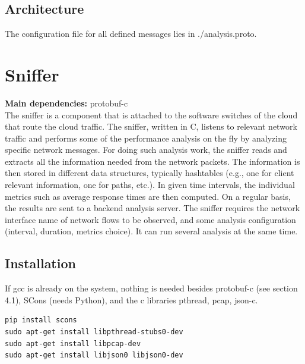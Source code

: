 \documentclass[12pt,hidelinks]{article}
\begin{document}
\subsection{Architecture}
The configuration file for all defined messages lies in ./analysis.proto.

\section{Sniffer}	
\vspace{7.5cm}

\textbf{Main dependencies:} protobuf-c
\\
The sniffer is a component that is attached to the software switches of the cloud that route the cloud traffic. The sniffer, written in C, listens to relevant network traffic and performs some of the performance analysis on the fly by analyzing specific network messages.
For doing such analysis work, the sniffer reads and extracts all the information needed from the network packets. The information is then stored in different data structures, typically hashtables (e.g., one for client relevant information, one for paths, etc.). In given time intervals, the individual metrics such as average response times are then computed. On a regular basis, the results are sent to a backend analysis server.
The sniffer requires the network interface name of network flows to be observed, and some analysis configuration (interval, duration, metrics choice). It can run several analysis at the same time.

\subsection{Installation} 
If gcc is already on the system, nothing is needed besides protobuf-c (see section 4.1), SCons (needs Python), and the c libraries pthread, pcap, json-c.
\begin{verbatim}
pip install scons
sudo apt-get install libpthread-stubs0-dev
sudo apt-get install libpcap-dev  
sudo apt-get install libjson0 libjson0-dev
\end{verbatim}
\end{document}
